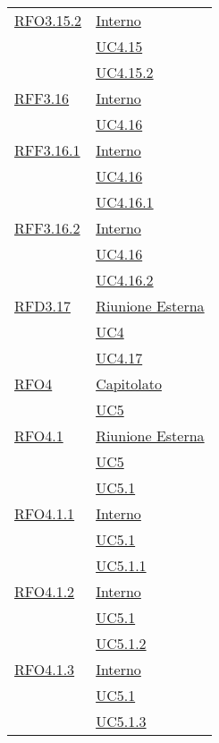 \begin{longtable}{|>{\centering}m{5cm}|m{5cm}<{\centering}|}
\hyperlink{RFO3.15.2}{RFO3.15.2} &  \hyperlink{Interno}{Interno}\\ &\hyperref[UC4.15]{UC4.15}\\ &\hyperref[UC4.15.2]{UC4.15.2}\\ \hline

\hyperlink{RFF3.16}{RFF3.16} & \hyperlink{Interno}{Interno}\\ &\hyperref[UC4.16]{UC4.16}\\ \hline

\hyperlink{RFF3.16.1}{RFF3.16.1} &   \hyperlink{Interno}{Interno}\\ &\hyperref[UC4.16]{UC4.16}\\ &\hyperref[UC4.16.1]{UC4.16.1}\\ \hline

\hyperlink{RFF3.16.2}{RFF3.16.2} &  \hyperlink{Interno}{Interno}\\ &\hyperref[UC4.16]{UC4.16}\\ &\hyperref[UC4.16.2]{UC4.16.2}\\ \hline

\hyperlink{RFD3.17}{RFD3.17} &   \hyperlink{Riunione Esterna}{Riunione Esterna}\\ &\hyperref[UC4]{UC4}\\ &\hyperref[UC4.17]{UC4.17}\\ \hline

\hyperlink{RFO4}{RFO4} & \hyperlink{Capitolato}{Capitolato}\\  &\hyperref[UC5]{UC5}\\ \hline

\hyperlink{RFO4.1}{RFO4.1} & \hyperlink{Riunione Esterna}{Riunione Esterna}\\ &\hyperref[UC5]{UC5}\\ &\hyperref[UC5.1]{UC5.1}\\ \hline

\hyperlink{RFO4.1.1}{RFO4.1.1} & \hyperlink{Interno}{Interno}\\ &\hyperref[UC5.1]{UC5.1}\\ &\hyperref[UC5.1.1]{UC5.1.1}\\ \hline

\hyperlink{RFO4.1.2}{RFO4.1.2} &  \hyperlink{Interno}{Interno}\\ &\hyperref[UC5.1]{UC5.1}\\ &\hyperref[UC5.1.2]{UC5.1.2}\\ \hline

\hyperlink{RFO4.1.3}{RFO4.1.3} & \hyperlink{Interno}{Interno}\\ &\hyperref[UC5.1]{UC5.1}\\ &\hyperref[UC5.1.3]{UC5.1.3}\\ \hline


\end{longtable}
